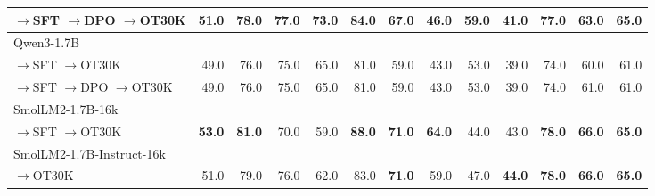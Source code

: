 \begin{table}[htbp]
{\begin{tabular}{lrrrrrrrrrrrr}
\quad $\to$SFT $\to$DPO $\to$OT30K                  & 51.0 & 78.0 & \textbf{77.0} & \textbf{73.0} & 84.0 & 67.0 & 46.0 & \textbf{59.0} & 41.0 & 77.0 & 63.0 & \textbf{65.0} \\
\midrule
\addlinespace[0.3em]
Qwen3-1.7B & & & & & & & & & & & &  \\
\quad $\to$SFT $\to$OT30K                        & 49.0 & 76.0 & 75.0 & 65.0 & 81.0 & 59.0 & 43.0 & 53.0 & 39.0 & 74.0 & 60.0 & 61.0 \\
\quad $\to$SFT $\to$DPO $\to$OT30K                  & 49.0 & 76.0 & 75.0 & 65.0 & 81.0 & 59.0 & 43.0 & 53.0 & 39.0 & 74.0 & 61.0 & 61.0 \\
\midrule
\addlinespace[0.3em]
SmolLM2-1.7B-16k & & & & & & & & & & & &  \\
\quad $\to$SFT $\to$OT30K                        & \textbf{53.0} & \textbf{81.0} & 70.0 & 59.0 & \textbf{88.0} & \textbf{71.0} & \textbf{64.0} & 44.0 & 43.0 & \textbf{78.0} & \textbf{66.0} & \textbf{65.0} \\
SmolLM2-1.7B-Instruct-16k & & & & & & & & & & & &  \\
\quad $\to$OT30K                              & 51.0 & 79.0 & 76.0 & 62.0 & 83.0 & \textbf{71.0} & 59.0 & 47.0 & \textbf{44.0} & \textbf{78.0} & \textbf{66.0} & \textbf{65.0} \\
\bottomrule
\end{tabular}%
}
\end{table}


